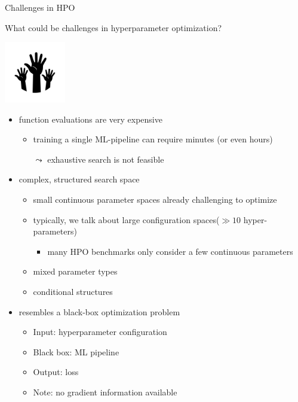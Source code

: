 \begin{frame}[c]{Challenges in HPO}
{%
	\centering
	
	\vspace*{2.25cm}
	
	What could be challenges in hyperparameter optimization?
	
	\bigskip
	
	\includegraphics[width=0.2\textwidth]{images/hands.png}
}%
\pause
\begin{itemize}
  \item function evaluations are very expensive
  \begin{itemize}
    \item training a single ML-pipeline can require minutes (or even hours) 
    \item[$\leadsto$] exhaustive search is not feasible
  \end{itemize}
  \pause
  \medskip
  \item complex, structured search space
  \begin{itemize}
    \item small continuous parameter spaces already challenging to optimize
    \item typically, we talk about large configuration spaces\newline ($\gg 10$ hyper-parameters)
    \begin{itemize}
      \item many HPO benchmarks only consider a few continuous parameters
    \end{itemize}
    \item mixed parameter types
    \item conditional structures
  \end{itemize}
  \pause
  \medskip
  \item resembles a black-box optimization problem
  \begin{itemize}
    \item Input: hyperparameter configuration
    \item Black box: ML pipeline 
    \item Output: loss
    \item Note: no gradient information available
  \end{itemize}
\end{itemize}

\end{frame}

